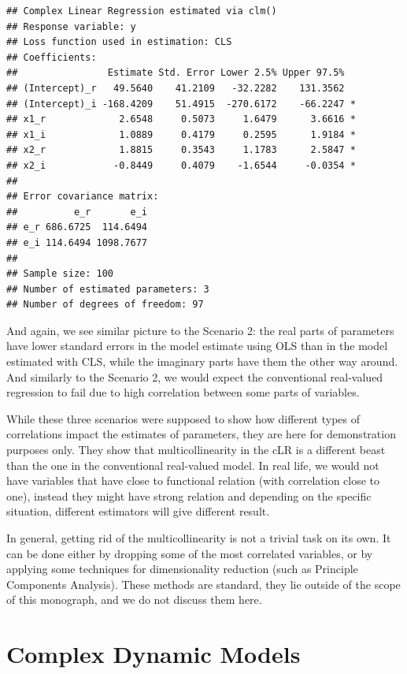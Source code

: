 \documentclass[
]{book}
\begin{document}
\begin{verbatim}
## Complex Linear Regression estimated via clm()
## Response variable: y
## Loss function used in estimation: CLS
## Coefficients:
##                Estimate Std. Error Lower 2.5% Upper 97.5%  
## (Intercept)_r   49.5640    41.2109   -32.2282    131.3562  
## (Intercept)_i -168.4209    51.4915  -270.6172    -66.2247 *
## x1_r             2.6548     0.5073     1.6479      3.6616 *
## x1_i             1.0889     0.4179     0.2595      1.9184 *
## x2_r             1.8815     0.3543     1.1783      2.5847 *
## x2_i            -0.8449     0.4079    -1.6544     -0.0354 *
## 
## Error covariance matrix:
##          e_r       e_i
## e_r 686.6725  114.6494
## e_i 114.6494 1098.7677
## 
## Sample size: 100
## Number of estimated parameters: 3
## Number of degrees of freedom: 97
\end{verbatim}

And again, we see similar picture to the Scenario 2: the real parts of parameters have lower standard errors in the model estimate using OLS than in the model estimated with CLS, while the imaginary parts have them the other way around. And similarly to the Scenario 2, we would expect the conventional real-valued regression to fail due to high correlation between some parts of variables.

While these three scenarios were supposed to show how different types of correlations impact the estimates of parameters, they are here for demonstration purposes only. They show that multicollinearity in the cLR is a different beast than the one in the conventional real-valued model. In real life, we would not have variables that have close to functional relation (with correlation close to one), instead they might have strong relation and depending on the specific situation, different estimators will give different result.

In general, getting rid of the multicollinearity is not a trivial task on its own. It can be done either by dropping some of the most correlated variables, or by applying some techniques for dimensionality reduction (such as Principle Components Analysis). These methods are standard, they lie outside of the scope of this monograph, and we do not discuss them here.

\hypertarget{Dynamic}{%
\chapter{Complex Dynamic Models}\label{Dynamic}}
\end{document}
